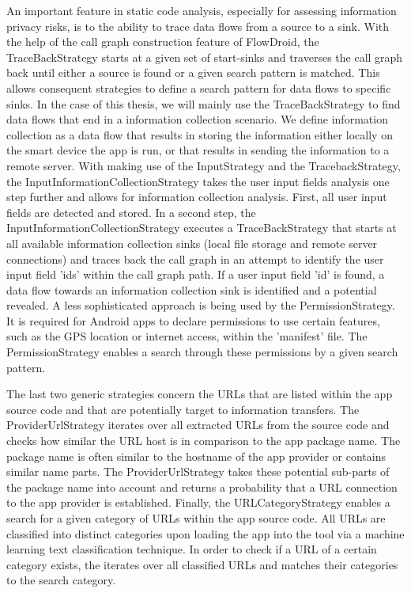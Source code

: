 An important feature in static code analysis, especially for assessing information privacy risks, is to the ability to trace data flows from a source to a sink.
With the help of the call graph construction feature of FlowDroid, the TraceBackStrategy starts at a given set of start-sinks and traverses the call graph back until either a source is found or a given search pattern is matched.
This allows consequent strategies to define a search pattern for data flows to specific sinks.
In the case of this thesis, we will mainly use the TraceBackStrategy to find data flows that end in a information collection scenario. 
We define information collection as a data flow that results in storing the information either locally on the smart device the app is run, or that results in sending the information to a remote server.
With making use of the InputStrategy and the TracebackStrategy, the InputInformationCollectionStrategy takes the user input fields analysis one step further and allows for information collection analysis.
First, all user input fields are detected and stored. 
In a second step, the InputInformationCollectionStrategy executes a TraceBackStrategy that starts at all available information collection sinks (local file storage and remote server connections) and traces back the call graph in an attempt to identify the user input field 'ids' within the call graph path.
If a user input field 'id' is found, a data flow towards an information collection sink is identified and a potential \ipr revealed.
A less sophisticated approach is being used by the PermissionStrategy.
It is required for Android apps to declare permissions to use certain features, such as the \acs{GPS} location or internet access, within the 'manifest' file.
The PermissionStrategy enables a search through these permissions by a given search pattern.

The last two generic strategies concern the \acs{URL}s that are listed within the app source code and that are potentially target to information transfers.
The ProviderUrlStrategy iterates over all extracted URLs from the source code and checks how similar the URL host is in comparison to the app package name.
The package name is often similar to the hostname of the app provider or contains similar name parts. 
The ProviderUrlStrategy takes these potential sub-parts of the package name into account and returns a probability that a URL connection to the app provider is established.
Finally, the URLCategoryStrategy enables a search for a given category of URLs within the app source code.
All URLs are classified into distinct categories upon loading the app into the \sca tool via a machine learning text classification technique.
In order to check if a URL of a certain category exists, the iterates over all classified URLs and matches their categories to the search category.

